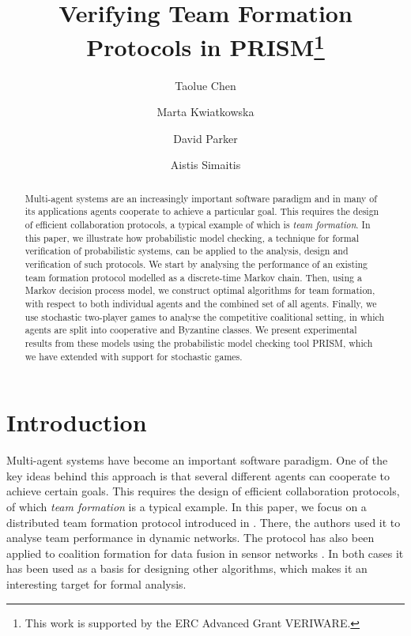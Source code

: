 \documentclass{llncs}
\newcommand{\taolue}[1]{\marginpar{\footnotesize \color{red} {\bf TL:} \textsf{#1}}}
\newcommand{\comment}[1]{\marginpar{\footnotesize \color{red} \textsf{#1}}}
\begin{document}
\title{Verifying Team Formation Protocols in PRISM\thanks{This work is supported by
the ERC Advanced Grant VERIWARE.}}
\author{Taolue Chen \and Marta Kwiatkowska \and David Parker \and Aistis Simaitis}
\email{}

\maketitle

\begin{abstract}
Multi-agent systems are an increasingly important software paradigm and in many of
its applications agents cooperate to achieve a particular goal.
This requires the design of efficient collaboration protocols,
a typical example of which is \emph{team formation}.
In this paper, we illustrate how probabilistic model checking,
a technique for formal verification of probabilistic systems,
can be applied to the analysis, design and verification of such protocols.
We start by analysing the performance of an existing team formation protocol
modelled as a discrete-time Markov chain.
Then, using a Markov decision process model,
we construct optimal algorithms for team formation,
with respect to both individual agents and the combined set of all agents.
Finally, we use stochastic two-player games to analyse the competitive coalitional setting,
in which agents are split into cooperative and Byzantine classes.
We present experimental results from these models
using the probabilistic model checking tool PRISM,
which we have extended with support for stochastic games.
\end{abstract}

\section{Introduction}

\comment{Add some comments about complexity}
Multi-agent systems have become an important software paradigm. One of the
key ideas behind this approach is that several different agents can cooperate to achieve certain goals.
This requires the design of efficient collaboration protocols, of which \emph{team formation} is a typical example. In this paper, we focus on a distributed team formation protocol introduced in \cite{gaston2005agent}. There, the authors used it to analyse team performance in dynamic networks.
The protocol %
has also been applied to coalition formation for data fusion in sensor networks \cite{glinton2008agent}. In both cases it has been used as a basis for designing other algorithms, which makes it an interesting target for formal analysis.
\end{document}
